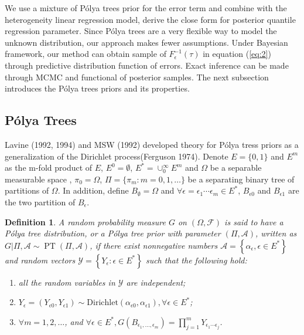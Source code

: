 \documentclass[12pt]{article}
\newtheorem{deff}[thm]{Definition}
\newcommand{\polya}{P\'{o}lya}
\DeclareMathOperator{\pt}{PT}
\begin{document}
We use a mixture of \polya{} trees prior for the error term and
combine with the heterogeneity linear regression model, derive the
close form for posterior quantile regression parameter. Since \polya{}
trees are a very flexible way to model the unknown distribution, our
approach makes fewer assumptions. Under Bayesian framework, our method
can obtain sample of $F^{-1}_{\epsilon}(\tau)$ in equation
(\ref{eq:2}) through predictive distribution function of errors. Exact
inference can be made through MCMC and functional of posterior
samples. The next subsection introduces the \polya{} trees priors and
its properties.

\subsection{\polya{} Trees}
Lavine (1992, 1994) and MSW (1992) developed theory for
\polya{} tress priors as a generalization of the Dirichlet
process(Ferguson 1974). Denote $E=\{0,1\}$ and $E^m$ as the m-fold
product of $E$, $E^0= \emptyset$, $E^{*} = \cup_0^{\infty} E^m$ and $\Omega$ be a separable
measurable space , $\pi_0 = \Omega$, $\Pi= \{ \pi_m: m=0,1, \ldots \}
$ be a separating binary tree of partitions of $\Omega$. In addition,
define $B_{\emptyset} = \Omega$ and $\forall \epsilon=\epsilon_1\cdots
\epsilon_m \in E^{*}$, $B_{\epsilon 0}$ and $B_{\epsilon 1}$ are the
two partition of $B_{\epsilon}$.  
\begin{deff}
A random probability measure $G$ on $(\Omega, \mathcal{F})$ is said to
have a \polya{} tree distribution, or a \polya{} tree prior with
parameter $(\Pi, \mathcal{A})$, written as $G|\Pi, \mathcal{A} \sim
\pt (\Pi, \mathcal{A})$, if there exist nonnegative numbers
$\mathcal{A}= \left\{ \alpha_{\epsilon}, \epsilon \in E^{*} \right\}$
and random vectors $\mathcal{Y} = \left\{ Y_{\epsilon} : \epsilon \in
  E^{*} \right\}$ such that the following hold:
\begin{enumerate}
\item\label{item:1} all the random variables in $\mathcal{Y}$ are independent;
\item $Y_{\epsilon}= (Y_{\epsilon 0} , Y_{\epsilon 1}) \sim
  \mathrm{Dirichlet}(\alpha_{\epsilon 0 }, \alpha_{\epsilon 1}),
  \forall \epsilon \in E^{*}$;
\item $\forall m=1,2, \ldots$, and $\forall \epsilon \in E^{*},
  G(B_{\epsilon_{1}, \ldots, \epsilon_m}) = \prod_{j=1}^m Y_{\epsilon_1
    \cdots \epsilon_j}$.
\end{enumerate} 
\end{deff}
\end{document}
